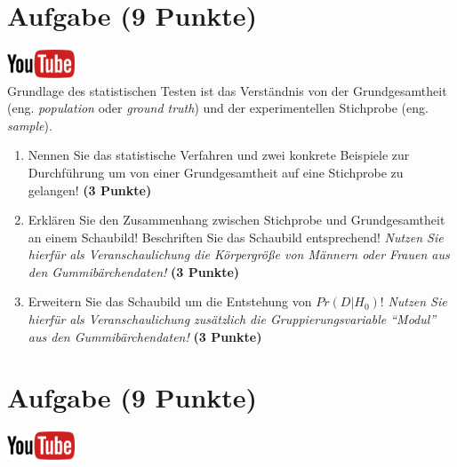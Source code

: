 \documentclass[a4paper, 9pt]{scrartcl}\usepackage[]{graphicx}\usepackage[]{xcolor}
\begin{document}
\section{Aufgabe \hfill (9 Punkte)}

\hfill\href{https://youtu.be/aHVYuFKTqZs}{\includegraphics[width =
  2cm]{img/youtube}}\\[1Ex]

Grundlage des statistischen Testen ist das Verst{\"a}ndnis von der
Grundgesamtheit (eng. \textit{population} oder \textit{ground truth}) und
der experimentellen Stichprobe (eng. \textit{sample}). 

\begin{enumerate}
\item Nennen Sie das statistische Verfahren und zwei konkrete Beispiele zur
  Durchf{\"u}hrung um von einer Grundgesamtheit auf eine Stichprobe zu
  gelangen! \textbf{(3 Punkte)}
\item Erkl{\"a}ren Sie den Zusammenhang zwischen Stichprobe und Grundgesamtheit
  an einem Schaubild! Beschriften Sie das Schaubild entsprechend!
  \textit{Nutzen Sie hierf{\"u}r als Veranschaulichung die K{\"o}rpergr{\"o}{\ss}e von
    M{\"a}nnern oder Frauen aus den Gummib{\"a}rchendaten!}  \textbf{(3 Punkte)}
\item Erweitern Sie das Schaubild um die Entstehung von $Pr(D|H_0)$!
  \textit{Nutzen Sie hierf{\"u}r als Veranschaulichung zus{\"a}tzlich die
    Gruppierungsvariable "`Modul"' aus den Gummib{\"a}rchendaten!}  \textbf{(3
    Punkte)}
\end{enumerate} 
\clearpage

\section{Aufgabe \hfill (9 Punkte)}

\hfill\href{https://youtu.be/Ric8ne39DtI}{\includegraphics[width =
  2cm]{img/youtube}}\\[1Ex]
\end{document}
